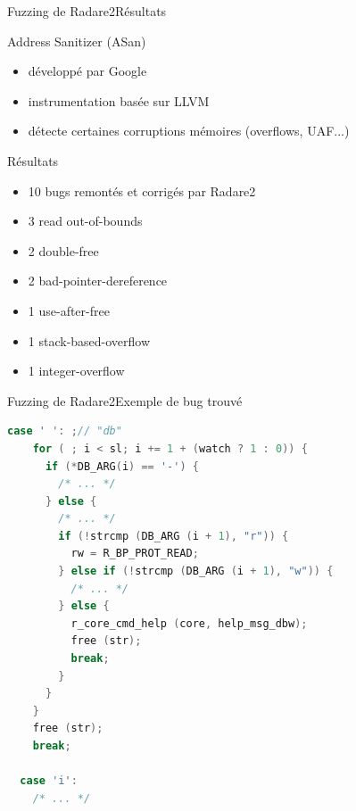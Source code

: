 \begin{frame}{Fuzzing de Radare2}{Résultats}
  \begin{exampleblock}{Address Sanitizer (ASan)}
    \begin{itemize}
    \item{développé par Google}
    \item{instrumentation basée sur LLVM}
    \item{détecte certaines corruptions mémoires (overflows, UAF...)}
    \end{itemize}
  \end{exampleblock}

  \pause

  \begin{block}{Résultats}
    \begin{itemize}
    \item{10 bugs remontés et corrigés par Radare2}
    \item{3 read out-of-bounds}
    \item{2 double-free}
    \item{2 bad-pointer-dereference}
    \item{1 use-after-free}
    \item{1 stack-based-overflow}
    \item{1 integer-overflow}
    \end{itemize}
  \end{block}
\end{frame}

\begin{frame}[fragile]{Fuzzing de Radare2}{Exemple de bug trouvé}
  \begin{lstlisting}[language=C]
  case ' ': ;// "db"
    for ( ; i < sl; i += 1 + (watch ? 1 : 0)) {
      if (*DB_ARG(i) == '-') {
        /* ... */
      } else {
        /* ... */
        if (!strcmp (DB_ARG (i + 1), "r")) {
          rw = R_BP_PROT_READ;
        } else if (!strcmp (DB_ARG (i + 1), "w")) {
          /* ... */
        } else {
          r_core_cmd_help (core, help_msg_dbw);
          free (str);
          break;
        }
      }
    }
    free (str);
    break;

  case 'i':
    /* ... */
  \end{lstlisting}
\end{frame}

